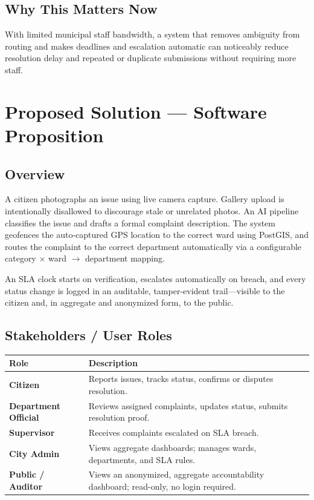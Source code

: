 \documentclass[12pt,a4paper]{article}
\begin{document}
\subsection*{Why This Matters Now}

With limited municipal staff bandwidth, a system that removes ambiguity from routing and makes deadlines and escalation automatic can noticeably reduce resolution delay and repeated or duplicate submissions without requiring more staff.

\section{Proposed Solution --- Software Proposition}

\subsection{Overview}

A citizen photographs an issue using live camera capture. Gallery upload is intentionally disallowed to discourage stale or unrelated photos. An AI pipeline classifies the issue and drafts a formal complaint description. The system geofences the auto-captured GPS location to the correct ward using PostGIS, and routes the complaint to the correct department automatically via a configurable category $\times$ ward $\rightarrow$ department mapping.

An SLA clock starts on verification, escalates automatically on breach, and every status change is logged in an auditable, tamper-evident trail---visible to the citizen and, in aggregate and anonymized form, to the public.

\subsection{Stakeholders / User Roles}

\begin{center}
\begin{tabular}{>{\bfseries}p{} p{}}
\toprule
Role & Description \\
\midrule
Citizen & Reports issues, tracks status, confirms or disputes resolution. \\
Department Official & Reviews assigned complaints, updates status, submits resolution proof. \\
Supervisor & Receives complaints escalated on SLA breach. \\
City Admin & Views aggregate dashboards; manages wards, departments, and SLA rules. \\
Public / Auditor & Views an anonymized, aggregate accountability dashboard; read-only, no login required. \\
\bottomrule
\end{tabular}
\end{center}
\end{document}
